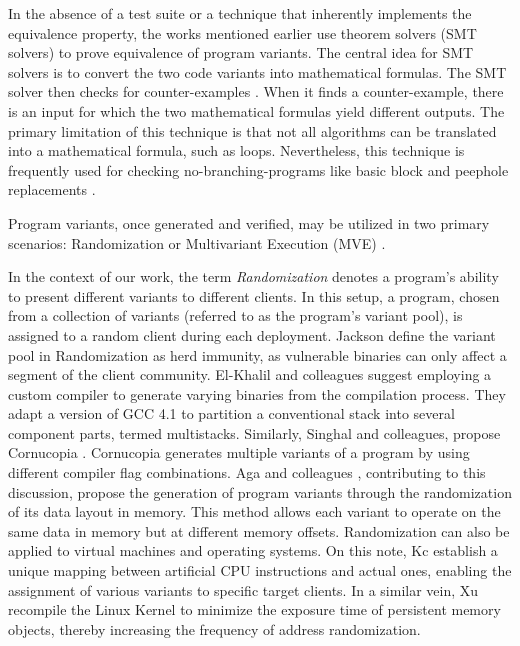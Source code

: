 \begin{checking}
    \label{check_by_smt}
    In the absence of a test suite or a technique that inherently implements the equivalence property, the works mentioned earlier use theorem solvers (SMT solvers) \cite{SMT_solver} to prove equivalence of program variants. 
    The central idea for SMT solvers is to convert the two code variants into mathematical formulas. 
    The SMT solver then checks for counter-examples \cite{kesseli2018counterexample}. 
    When it finds a counter-example, there is an input for which the two mathematical formulas yield different outputs. 
    The primary limitation of this technique is that not all algorithms can be translated into a mathematical formula, such as loops. 
    Nevertheless, this technique is frequently used for checking no-branching-programs like basic block and peephole replacements \cite{SuperoptimizationScaling}.
\end{checking}



\label{deployment}
Program variants, once generated and verified, may be utilized in two primary scenarios: Randomization or Multivariant Execution (MVE) \cite{jackson}. 


\begin{strategy}[Randomization]
    \label{randomization}
    In the context of our work, the term \emph{Randomization} denotes a program's ability to present different variants to different clients. 
    In this setup, a program, chosen from a collection of variants (referred to as the program's variant pool), is assigned to a random client during each deployment. 
    Jackson \etal \cite{jackson} define the variant pool in Randomization as herd immunity, as vulnerable binaries can only affect a segment of the client community. 
    El-Khalil and colleagues \cite{ElKhalil2004} suggest employing a custom compiler to generate varying binaries from the compilation process. 
    They adapt a version of GCC 4.1 to partition a conventional stack into several component parts, termed multistacks. 
    Similarly, Singhal and colleagues, propose Cornucopia \cite{cornucopia}.
    Cornucopia generates multiple variants of a program by using different compiler flag combinations.
    Aga and colleagues \cite{aga2019smokestack}, contributing to this discussion, propose the generation of program variants through the randomization of its data layout in memory. 
    This method allows each variant to operate on the same data in memory but at different memory offsets. 
    Randomization can also be applied to virtual machines and operating systems. On this note, Kc \etal \cite{Kc03} establish a unique mapping between artificial CPU instructions and actual ones, enabling the assignment of various variants to specific target clients. 
    In a similar vein, Xu \etal \cite{xu2020merr} recompile the Linux Kernel to minimize the exposure time of persistent memory objects, thereby increasing the frequency of address randomization.
\end{strategy}


